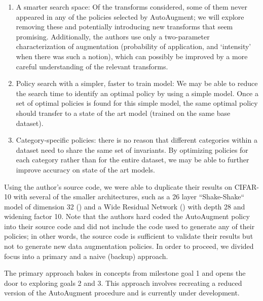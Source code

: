 \documentclass[10pt,twocolumn,letterpaper]{article}
\begin{document}
	\begin{enumerate}

		\item %
			A smarter search space: Of the transforms considered, some of them never appeared in any of the policies selected by AutoAugment; we will explore removing these and potentially introducing new transforms that seem promising. Additionally, the authors use only a two-parameter characterization of augmentation (probability of application, and ‘intensity’ when there was such a notion), which can possibly be improved by a more careful understanding of the relevant transforms.
	
		\item %
			Policy search with a simpler, faster to train model: We may be able to reduce the search time to identify an optimal policy by using a simple model. Once a set of optimal policies is found for this simple model, the same optimal policy should transfer to a state of the art model (trained on the same base dataset).
	
		\item %
			Category-specific policies: there is no reason that different categories within a dataset need to share the same set of invariants. By optimizing policies for each category rather than for the entire dataset, we may be able to further improve accuracy on state of the art models.

	\end{enumerate}

	Using the author's source code, we were able to duplicate their results on CIFAR-10 with several of the smaller architectures, such as a 26 layer ``Shake-Shake`` model of dimension 32 (\cite{Gastaldi2017}) and a Wide Residual Network (\cite{Zagoruyko2016}) with depth 28 and widening factor 10. Note that the authors hard coded the AutoAugment policy into their source code and did not include the code used to generate any of their policies; in other words, the source code is sufficient to validate their results but not to generate new data augmentation policies. In order to proceed, we divided focus into a primary and a naive (backup) approach. 

	The primary approach bakes in concepts from milestone goal 1 and opens the door to exploring goals 2 and 3. This approach involves recreating a reduced version of the AutoAugment procedure and is currently under development.
\end{document}
